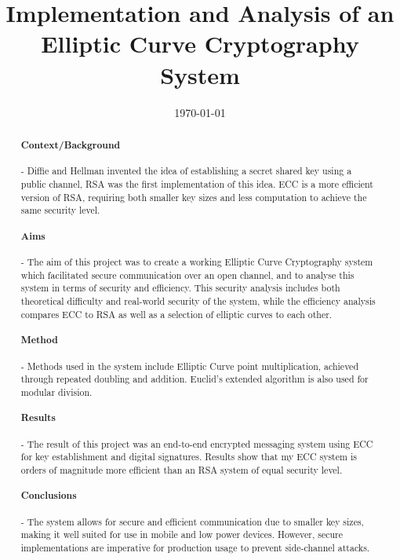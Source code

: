 \documentclass[12pt,a4paper]{article}
\title{Implementation and Analysis of an Elliptic Curve Cryptography System}
\date{\today}
\begin{document}
\maketitle

\begin{abstract}

    \paragraph{Context/Background} -
    Diffie and Hellman invented the idea of establishing a secret shared key using a public channel, 
    RSA was the first implementation of this idea. 
    ECC is a more efficient version of RSA, requiring both smaller key sizes and less computation to achieve the same security level. 

    \paragraph{Aims} -
    The aim of this project was to create a working Elliptic Curve Cryptography system which facilitated secure communication over an open channel, 
    and to analyse this system in terms of security and efficiency. 
    This security analysis includes both theoretical difficulty and real-world security of the system, 
    while the efficiency analysis compares ECC to RSA as well as a selection of elliptic curves to each other. 

    \paragraph{Method} -
    Methods used in the system include Elliptic Curve point multiplication, achieved through repeated doubling and addition. 
    Euclid's extended algorithm is also used for modular division. 

    \paragraph{Results} -
    The result of this project was an end-to-end encrypted messaging system using ECC for key establishment and digital signatures. 
    Results show that my ECC system is orders of magnitude more efficient than an RSA system of equal security level. 

    \paragraph{Conclusions} -
    The system allows for secure and efficient communication due to smaller key sizes, making it well suited for use in mobile and low power devices. 
    However, secure implementations are imperative for production usage to prevent side-channel attacks. 

\end{abstract}
\end{document}
